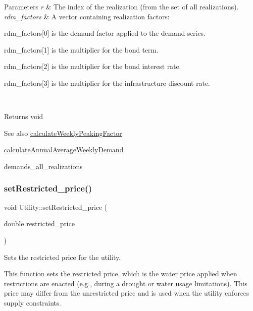 \begin{DoxyParams}{Parameters}
{\em r} & The index of the realization (from the set of all realizations). \\
\hline
{\em rdm\+\_\+factors} & A vector containing realization factors\+:
\begin{DoxyItemize}
\item rdm\+\_\+factors\mbox{[}0\mbox{]} is the demand factor applied to the demand series.
\item rdm\+\_\+factors\mbox{[}1\mbox{]} is the multiplier for the bond term.
\item rdm\+\_\+factors\mbox{[}2\mbox{]} is the multiplier for the bond interest rate.
\item rdm\+\_\+factors\mbox{[}3\mbox{]} is the multiplier for the infrastructure discount rate.
\end{DoxyItemize}\\
\hline
\end{DoxyParams}
\begin{DoxyReturn}{Returns}
void
\end{DoxyReturn}
\begin{DoxySeeAlso}{See also}
\mbox{\hyperlink{classUtility_a54c8621f2cce5257343f8dc6bfd76cff}{calculate\+Weekly\+Peaking\+Factor}} 

\mbox{\hyperlink{classUtility_a5bae4fe8c3f0c782f0cdf5d14b7b92a7}{calculate\+Annual\+Average\+Weekly\+Demand}} 

demands\+\_\+all\+\_\+realizations 
\end{DoxySeeAlso}
\mbox{\label{classUtility_a7f642d886a6d1d165e86b2e6a7c51ed4}} 
\subsubsection{\texorpdfstring{set\+Restricted\+\_\+price()}{setRestricted\_price()}}
{\footnotesize\ttfamily void Utility\+::set\+Restricted\+\_\+price (\begin{DoxyParamCaption}\item[{double}]{restricted\+\_\+price }\end{DoxyParamCaption})}



Sets the restricted price for the utility. 

This function sets the restricted price, which is the water price applied when restrictions are enacted (e.\+g., during a drought or water usage limitations). This price may differ from the unrestricted price and is used when the utility enforces supply constraints.


